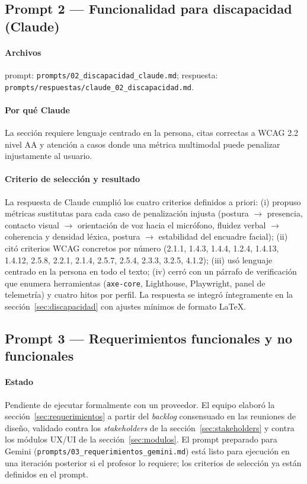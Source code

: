 \subsection{Prompt 2 --- Funcionalidad para discapacidad (Claude)}
\paragraph{Archivos} prompt: \texttt{prompts/02\_discapacidad\_claude.md};
respuesta: \texttt{prompts/respuestas/claude\_02\_discapacidad.md}.

\paragraph{Por qué Claude} La sección requiere lenguaje centrado en la
persona, citas correctas a WCAG 2.2 nivel AA y atención a casos donde
una métrica multimodal puede penalizar injustamente al usuario.

\paragraph{Criterio de selección y resultado} La respuesta de Claude
cumplió los cuatro criterios definidos a priori: (i) propuso métricas
sustitutas para cada caso de penalización injusta (postura
$\to$ presencia, contacto visual $\to$ orientación de voz hacia el
micrófono, fluidez verbal $\to$ coherencia y densidad léxica, postura
$\to$ estabilidad del encuadre facial); (ii) citó criterios WCAG
concretos por número (2.1.1, 1.4.3, 1.4.4, 1.2.4, 1.4.13, 1.4.12,
2.5.8, 2.2.1, 2.1.4, 2.5.7, 2.5.4, 2.3.3, 3.2.5, 4.1.2); (iii) usó
lenguaje centrado en la persona en todo el texto; (iv) cerró con un
párrafo de verificación que enumera herramientas (\texttt{axe-core},
Lighthouse, Playwright, panel de telemetría) y cuatro hitos por perfil.
La respuesta se integró íntegramente en la sección~\ref{sec:discapacidad}
con ajustes mínimos de formato LaTeX.

\subsection{Prompt 3 --- Requerimientos funcionales y no funcionales}
\paragraph{Estado} Pendiente de ejecutar formalmente con un proveedor.
El equipo elaboró la sección~\ref{sec:requerimientos} a partir del
\textit{backlog} consensuado en las reuniones de diseño, validado
contra los \textit{stakeholders} de la sección~\ref{sec:stakeholders}
y contra los módulos UX/UI de la sección~\ref{sec:modulos}. El prompt
preparado para Gemini (\texttt{prompts/03\_requerimientos\_gemini.md})
está listo para ejecución en una iteración posterior si el profesor
lo requiere; los criterios de selección ya están definidos en el
prompt.

